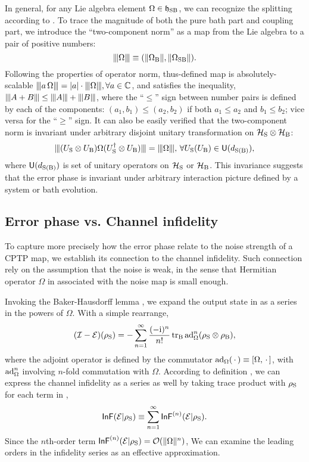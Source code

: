 \documentclass[aps,pra,reprint,superscriptaddress]{revtex4-2}
\begin{document}
In general, for any Lie algebra element $\Omega \in \mathfrak{h}_{\mathrm{SB}}$, we can recognize the splitting according to . To trace the magnitude of both the pure bath part and coupling part,
we introduce the ``two-component norm'' as a map from the Lie algebra to a pair of positive numbers:
\begin{equation}
\opnorm{\Omega} 
    \equiv  (
        \norm{\Omega_\rB},
        \norm{\Omega_\rSB}).
\end{equation}
Following the properties of operator norm, thus-defined map is  absolutely-scalable $\opnorm{a\, \Omega}= |a|\cdot \opnorm{\Omega}, \forall a \in \mathbb{C}$,
and satisfies the inequality, 
$\opnorm{A+B}\le \opnorm{A} + \opnorm{B}$,
where  the ``$\le$'' sign between number pairs  is defined by each of the components: $(a_1,b_1)\le(a_2,b_2)$ if both $a_1\le a_2$ and $b_1\le b_2$; vice versa for  the ``$\ge$'' sign. 
It can also be easily verified that the two-component norm is invariant under arbitrary disjoint unitary transformation on $\mathcal{H}_{\mathrm{S}}\otimes\mathcal{H}_{\mathrm{B}}$:
\begin{equation}
    \opnorm{(U_\rS \otimes U_\rB) \Omega (U_\rS ^\dagger \otimes U_\rB)} = \opnorm{\Omega},\, \forall U_{\rS} (U_{\rB})  \in \sU(d_{\rS(\rB)}),
\end{equation}
where $\mathsf{U}(d_{\mathrm{S}(\mathrm{B})})$ is set of unitary operators on $\mathcal{H}_{\mathrm{S}}$ or $\mathcal{H}_{\mathrm{B}}$.
This invariance suggests that the error phase is invariant under arbitrary interaction picture defined by a system or bath evolution.


\subsection{Error phase vs. Channel infidelity}\label{sec:errph.vs.inf}
To capture more precisely how the error phase relate to the noise strength of a CPTP map, we establish its connection to the channel infidelity.
Such connection rely on the assumption that the noise is weak, in the sense that Hermitian operator $\Omega$ in  associated with the noise map is small enough.

Invoking the Baker-Hausdorff lemma \cite{rossmann2006lie}, we expand the output state in  as a series in the powers of $\Omega$. With a simple rearrange,
\begin{equation}\label{eq:channel-series}
(\mathcal{I}-\mathcal{E})(\rho_\mathrm{S}) 
=-\sum_{n=1}^\infty \frac{(-\mathrm{i})^n}{n!} \operatorname{\operatorname{tr}_\mathrm{B}}\operatorname{ad}_{\Omega}^n(\rho_\mathrm{S}\otimes\rho_\mathrm{B}),
\end{equation}
where the adjoint operator is defined by the commutator $\operatorname{ad}_\Omega({\,\cdot\,})\equiv[\Omega,{\,\cdot\,}]$, with $\operatorname{ad}^n_\Omega$ involving $n$-fold commutation with $\Omega$. According to definition , we can express the channel infidelity as a series as well by taking trace product with $\rho_\mathrm{S}$ for each term in ,
\begin{equation}
\operatorname{\mathsf{InF}}(\mathcal{E}|\rho_{\mathrm{S}}) \equiv  \sum_{n=1}^\infty \operatorname{\mathsf{InF}}^{(n)}(\mathcal{E}|\rho_{\mathrm{S}}).
\end{equation}
Since the $n$th-order term $\operatorname{\mathsf{InF}}^{(n)}(\mathcal{E}|\rho_{\mathrm{S}}) =\mathcal{O}(\Vert {\Omega} \Vert^n)$,
We can examine the leading orders in the infidelity series as an effective approximation. 
\end{document}
